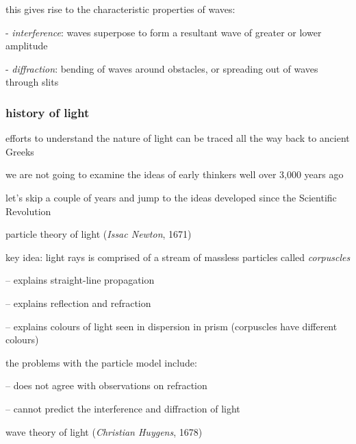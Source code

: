 this gives rise to the characteristic properties of waves:

\begin{compactenum}
	\item[-] \emph{interference}: waves superpose to form a resultant wave of greater or lower amplitude
	
	\item[-] \emph{diffraction}: bending of waves around obstacles, or spreading out of waves through slits
\end{compactenum}



\subsubsection{history of light}

efforts to understand the nature of light can be traced all the way back to ancient Greeks 

we are not going to examine the ideas of early thinkers well over 3,000 years ago

let's skip a couple of years and jump to the ideas developed since the Scientific Revolution


\cmt particle theory of light (\emph{Issac Newton}, 1671)

key idea: light rays is comprised of a stream of massless particles called \emph{corpuscles}

\begin{compactitem}
	\item[--] explains straight-line propagation
	
	\item[--] explains reflection and refraction
	
	\item[--] explains colours of light seen in dispersion in prism (corpuscles have different colours)
\end{compactitem}

the problems with the particle model include:

\begin{compactitem}
	\item[--] does not agree with observations on refraction
	
	\item[--] cannot predict the interference and diffraction of light
\end{compactitem}

\cmt wave theory of light (\emph{Christian Huygens}, 1678)

